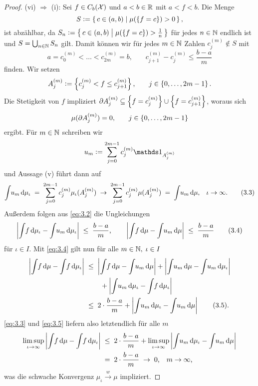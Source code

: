 \documentclass[../main/main.tex]{subfiles}
\begin{document}
\begin{proof}
		(vi) $\Rightarrow$ (i): Sei $f \in C_b(\mathcal{X})$ und $a < b \in \mathbb{R}$ 
		mit $a < f < b$. Die Menge
		$$S \vcentcolon = \left\{\, c \in (a, b) \; \middle| \; \mu(\left\{f = c\right\}) > 0 \,\right\} \text{,}$$
		ist abzählbar, da 
		$S_n \vcentcolon = \left\{\, c \in (a, b) \; \middle| \; \mu(\left\{f = c\right\}) > \frac{1}{n} \,\right\}$ 
		für jedes $n \in \mathbb{N}$ endlich ist und $S = \bigcup_{n \in \mathbb{N}} S_n$ gilt.
		Damit können wir für jedes $m \in \mathbb{N}$ Zahlen $c_j^{(m)} \notin S$ mit
		\[a = c_0^{(m)} < \dots < c_{2m}^{(m)} = 
		b \text{,} \qquad c_{j+1}^{(m)} - c_j^{(m)} \leq \frac{b-a}{m} 
		\label{eq:3.2} \tag{3.2}\]
		finden. Wir setzen
		$$A_j^{(m)} \vcentcolon = \left\{c_j^{(m)} < f \leq c_{j+1}^{(m)}\right\}\text{,}
		\qquad j \in \left\{0,\dots,2m-1\right\} \text{.}$$ 
		Die Stetigkeit von $f$ impliziert 
		$\partial A_j^{(m)} \subseteq \left\{f = c_j^{(m)}\right\} \cup \left\{f = c_{j+1}^{(m)}\right\}$, 
		woraus sich 
		$$\mu(\partial A_j^{(m)}) = 0 \text{,} \qquad j \in \left\{0,\dots,2m-1\right\}$$
		ergibt. Für $m \in \mathbb{N}$ schreiben wir
		$$u_m \defby \sum_{j=0}^{2m-1} c_j^{(m)} \indfct_{A_j^{(m)}}$$
		und Aussage (v) führt dann auf
		\[\int_{} \, u_m \, \mathrm{d}\mu_\iota \; = \; \sum_{j=0}^{2m-1} c_j^{(m)} \mu_\iota(A_j^{(m)}) 
		\; \to \; \sum_{j=0}^{2m-1} c_j^{(m)} \mu(A_j^{(m)}) \; = \; 
		\int_{} \, u_m \, \mathrm{d}\mu \text{,} \quad \iota \to \infty \text{.} 
		\label{eq:3.3} \tag{3.3}\]
		Außerdem folgen aus \eqref{eq:3.2} die Ungleichungen
		\[\left| \int_{} \, f \, \mathrm{d}\mu_\iota - \int_{} \, u_m \, \mathrm{d}\mu_\iota \right| \; \leq \; 
		\frac{b-a}{m} \text{,} \qquad 
		\left| \int_{} \, f \, \mathrm{d}\mu - \int_{} \, u_m \, \mathrm{d}\mu \right| \; \leq \; 
		\frac{b-a}{m} \label{eq:3.4} \tag{3.4}\]
		für $\iota \in I$.
		Mit \eqref{eq:3.4} gilt nun für alle $m \in \mathbb{N}, \; \iota \in I$
		\begin{align*}
			\left| \int_{} \, f \, \mathrm{d}\mu - \int_{} \, f \, \mathrm{d}\mu_\iota \right| \; &\leq \; 
			\left| \int_{} \, f \, \mathrm{d}\mu - \int_{} \, u_m \, \mathrm{d}\mu \right| + 
			\left| \int_{} \, u_m \, \mathrm{d}\mu - \int_{} \, u_m \, \mathrm{d}\mu_\iota \right| \\ & \qquad + 
			\left| \int_{} \, u_m \, \mathrm{d}\mu_\iota - \int_{} \, f \, \mathrm{d}\mu_\iota \right| \\
			&\leq \; 2 \cdot \frac{b-a}{m} + \left| \int_{} \, u_m \, \mathrm{d}\mu_\iota - 
			\int_{} \, u_m \, \mathrm{d}\mu \right| \label{eq:3.5} \tag{3.5}\text{.}
		\end{align*}
		\eqref{eq:3.3} und \eqref{eq:3.5} liefern also letztendlich für alle $m$
		\begin{align*}
			\limsup_{\iota \to \infty} \left| \int_{} \, f \, \mathrm{d}\mu - 
			\int_{} \, f \, \mathrm{d}\mu_\iota \right|
			\; &\leq \; 2 \cdot \frac{b-a}{m} + 
			\limsup_{\iota \to \infty} \left| \int_{} \, u_m \, \mathrm{d}\mu_\iota - 
			\int_{} \, u_m \, \mathrm{d}\mu \right| \\
			&= \; 2 \cdot \frac{b-a}{m} \; \to \; 0 \text{,} 
			\quad m \to \infty \text{,}
		\end{align*}
		was die schwache Konvergenz $\mu_\iota \xrightarrow{w} \mu$ impliziert.
	\end{proof}
\end{document}
